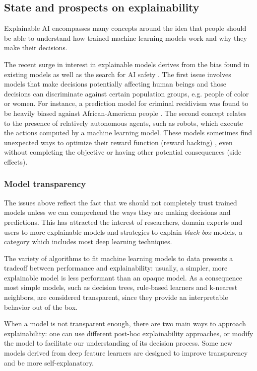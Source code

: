 \subsection{State and prospects on explainability}

Explainable AI  encompasses many concepts around the idea that people should be able to understand how trained machine learning models work and why they make their decisions.

The recent surge in interest in explainable models derives from the bias found in existing models as well as the search for AI safety . The first issue involves models that make decisions potentially affecting human beings and those decisions can discriminate against certain population groups, e.g. people of color or women. For instance, a prediction model for criminal recidivism was found to be heavily biased against African-American people . The second concept relates to the presence of relatively autonomous agents, such as robots, which execute the actions computed by a machine learning model. These models sometimes find unexpected ways to optimize their reward function (reward hacking) , even without completing the objective or having other potential consequences (side effects).

\subsubsection{Model transparency}

The issues above reflect the fact that we should not completely trust trained models unless we can comprehend the ways they are making decisions and predictions. This has attracted the interest of researchers, domain experts and users to more explainable models and strategies to explain \textit{black-box} models, a category which includes most deep learning techniques.

The variety of algorithms to fit machine learning models to data presents a tradeoff between performance and explainability: usually, a simpler, more explainable model is less performant than an opaque model. As a consequence most simple models, such as decision trees, rule-based learners and k-nearest neighbors, are considered transparent, since they provide an interpretable behavior out of the box.

When a model is not transparent enough, there are two main ways to approach explainability: one can use different post-hoc explainability approaches, or modify the model to facilitate our understanding of its decision process. Some new models derived from deep feature learners are designed to improve transparency and be more self-explanatory. 

